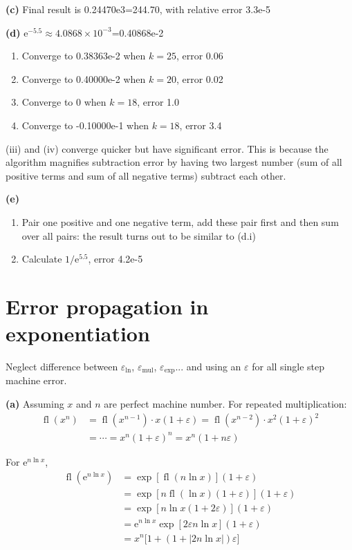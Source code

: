 \documentclass[11pt]{article}
\numberwithin{equation}{section} %
\newcommand\e{\mathrm{e}}
\DeclareMathOperator{\fl}{fl}
\begin{document}
\textbf{(c)} Final result is 0.24470e3=244.70, with relative error 3.3e-5

\textbf{(d)} $\e^{-5.5}\approx 4.0868\times 10^{-3}$=0.40868e-2
\begin{enumerate}[label=(\roman*)]
  \item Converge to 0.38363e-2 when $k=25$, error 0.06
  \item Converge to 0.40000e-2 when $k=20$, error 0.02
  \item Converge to 0 when $k=18$, error 1.0
  \item Converge to -0.10000e-1 when $k=18$, error 3.4
\end{enumerate}
(iii) and (iv) converge quicker but have significant error. This is because 
the algorithm magnifies subtraction error by having two largest number (sum 
of all positive terms and sum of all negative terms) subtract each other. 

\textbf{(e)}
\begin{enumerate}[label=(\roman*)]
  \item Pair one positive and one negative term, add these pair first and 
    then sum over all pairs: the result turns out to be similar to (d.i)
  \item Calculate $1/\e^{5.5}$, error 4.2e-5
\end{enumerate}



\section{Error propagation in exponentiation}
Neglect difference between $\varepsilon_{\ln}$, $\varepsilon_{\text{mul}}$, 
$\varepsilon_{\exp}$... and using an $\varepsilon$ for all single step 
machine error. 

\textbf{(a)} Assuming $x$ and $n$ are perfect machine number. 
For repeated multiplication: 
\begin{align}
  \fl(x^n) &= \fl(x^{n-1})\cdot x (1+\varepsilon) 
  = \fl(x^{n-2})\cdot x^2 (1+\varepsilon)^2 \\
           &= \cdots = x^n (1+\varepsilon)^n = x^n ( 1+ n\varepsilon)
\end{align}

For $\e^{n\ln x}$, 
\begin{align}
  \fl(\e^{n\ln x}) 
  &= \exp\left[\fl(n\ln x)\right](1+\varepsilon) \\
  &= \exp\left[n\fl(\ln x)(1+\varepsilon)\right](1+\varepsilon) \\
  &= \exp\left[n\ln x ( 1+2\varepsilon)\right](1+\varepsilon) \\
  &= \e^{n\ln x}\exp\left[2\varepsilon n\ln x \right](1+\varepsilon) \\
  &= x^n \big[1+(1+|2n\ln x|)\varepsilon\big] \label{eq:lnerror}
\end{align}
\end{document}
